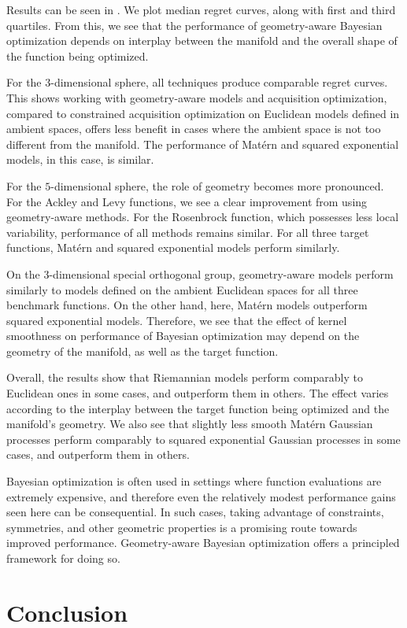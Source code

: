 \documentclass[11pt]{book}
\begin{document}
Results can be seen in .
We plot median regret curves, along with first and third quartiles.
From this, we see that the performance of geometry-aware Bayesian optimization depends on interplay between the manifold and the overall shape of the function being optimized. 

For the $3$-dimensional sphere, all techniques produce comparable regret curves.
This shows working with geometry-aware models and acquisition optimization, compared to constrained acquisition optimization on Euclidean models defined in ambient spaces, offers less benefit in cases where the ambient space is not too different from the manifold.
The performance of Matérn and squared exponential models, in this case, is similar.

For the $5$-dimensional sphere, the role of geometry becomes more pronounced.
For the Ackley and Levy functions, we see a clear improvement from using geometry-aware methods.
For the Rosenbrock function, which possesses less local variability, performance of all methods remains similar.
For all three target functions, Matérn and squared exponential models perform similarly.

On the $3$-dimensional special orthogonal group, geometry-aware models perform similarly to models defined on the ambient Euclidean spaces for all three benchmark functions.
On the other hand, here, Matérn models outperform squared exponential models. 
Therefore, we see that the effect of kernel smoothness on performance of Bayesian optimization may depend on the geometry of the manifold, as well as the target function.

Overall, the results show that Riemannian models perform comparably to Euclidean ones in some cases, and outperform them in others.
The effect varies according to the interplay between the target function being optimized and the manifold's geometry.
We also see that slightly less smooth Matérn Gaussian processes perform comparably to squared exponential Gaussian processes in some cases, and outperform them in others.

Bayesian optimization is often used in settings where function evaluations are extremely expensive, and therefore even the relatively modest performance gains seen here can be consequential.
In such cases, taking advantage of constraints, symmetries, and other geometric properties is a promising route towards improved performance.
Geometry-aware Bayesian optimization offers a principled framework for doing so.


\section{Conclusion}
\end{document}
